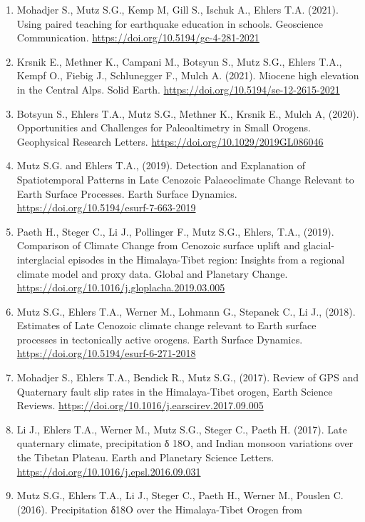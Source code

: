 \documentclass[
  letterpaper,
  DIV=11,
  numbers=noendperiod]{scrartcl}
\begin{document}
\begin{enumerate}
  Atmospheres. \url{https://doi.org/10.1029/2020JD033965}
\item
  Mohadjer S., Mutz S.G., Kemp M, Gill S., Ischuk A., Ehlers T.A.
  (2021). Using paired teaching for earthquake education in schools.
  Geoscience Communication. \url{https://doi.org/10.5194/gc-4-281-2021}
\item
  Krsnik E., Methner K., Campani M., Botsyun S., Mutz S.G., Ehlers T.A.,
  Kempf O., Fiebig J., Schlunegger F., Mulch A. (2021). Miocene high
  elevation in the Central Alps. Solid Earth.
  \url{https://doi.org/10.5194/se-12-2615-2021}
\item
  Botsyun S., Ehlers T.A., Mutz S.G., Methner K., Krsnik E., Mulch A,
  (2020). Opportunities and Challenges for Paleoaltimetry in Small
  Orogens. Geophysical Research Letters.
  \url{https://doi.org/10.1029/2019GL086046}
\item
  Mutz S.G. and Ehlers T.A., (2019). Detection and Explanation of
  Spatiotemporal Patterns in Late Cenozoic Palaeoclimate Change Relevant
  to Earth Surface Processes. Earth Surface Dynamics.
  \url{https://doi.org/10.5194/esurf-7-663-2019}
\item
  Paeth H., Steger C., Li J., Pollinger F., Mutz S.G., Ehlers, T.A.,
  (2019). Comparison of Climate Change from Cenozoic surface uplift and
  glacial-interglacial episodes in the Himalaya-Tibet region: Insights
  from a regional climate model and proxy data. Global and Planetary
  Change. \url{https://doi.org/10.1016/j.gloplacha.2019.03.005}
\item
  Mutz S.G., Ehlers T.A., Werner M., Lohmann G., Stepanek C., Li J.,
  (2018). Estimates of Late Cenozoic climate change relevant to Earth
  surface processes in tectonically active orogens. Earth Surface
  Dynamics. \url{https://doi.org/10.5194/esurf-6-271-2018}
\item
  Mohadjer S., Ehlers T.A., Bendick R., Mutz S.G., (2017). Review of GPS
  and Quaternary fault slip rates in the Himalaya-Tibet orogen, Earth
  Science Reviews. \url{https://doi.org/10.1016/j.earscirev.2017.09.005}
\item
  Li J., Ehlers T.A., Werner M., Mutz S.G., Steger C., Paeth H. (2017).
  Late quaternary climate, precipitation δ 18O, and Indian monsoon
  variations over the Tibetan Plateau. Earth and Planetary Science
  Letters. \url{https://doi.org/10.1016/j.epsl.2016.09.031}
\item
  Mutz S.G., Ehlers T.A., Li J., Steger C., Paeth H., Werner M., Pouslen
  C. (2016). Precipitation δ18O over the Himalaya-Tibet Orogen from

\end{enumerate}
\end{document}
